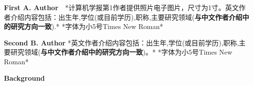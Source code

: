 \documentclass[10.5pt,compsoc]{CjC}
\theoremstyle{mystyle}
\begin{document}
\begin{biography}
	\noindent
	\textbf{First A. Author}\ \ *计算机学报第1作者提供照片电子图片，尺寸为1寸。英文作者介绍内容包括：出生年,学位(或目前学历),职称,主要研究领域(\textbf{与中文作者介绍中的研究方向一致}).*
	*字体为小5号Times New Roman*
\end{biography}

\begin{biography}
	\noindent
	\textbf{Second B. Author} *英文作者介绍内容包括：出生年,学位(或目前学历),职称,主要研究领域(\textbf{与中文作者介绍中的研究方向一致})。*
	*字体为小5号Times New Roman*
\end{biography}

\noindent \textbf{Background}

\end{document}
